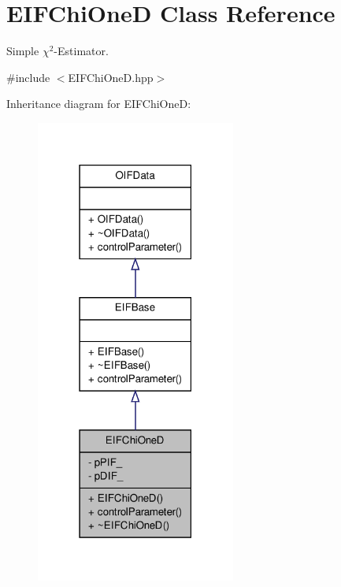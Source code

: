 \hypertarget{classEIFChiOneD}{
\section{EIFChiOneD Class Reference}
\label{db/d1d/classEIFChiOneD}
}


Simple $\chi^{2}$-\/Estimator.  




{\ttfamily \#include $<$EIFChiOneD.hpp$>$}



Inheritance diagram for EIFChiOneD:\nopagebreak
\begin{figure}[H]
\begin{center}
\leavevmode
\includegraphics[width=186pt]{dc/de7/classEIFChiOneD__inherit__graph}
\end{center}
\end{figure}


